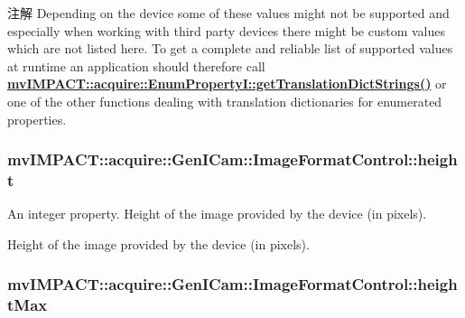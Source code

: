 \begin{DoxyNote}{注解}
Depending on the device some of these values might not be supported and especially when working with third party devices there might be custom values which are not listed here. To get a complete and reliable list of supported values at runtime an application should therefore call {\bfseries \hyperlink{classmv_i_m_p_a_c_t_1_1acquire_1_1_enum_property_i_a0ba6ccbf5ee69784d5d0b537924d26b6}{mv\+I\+M\+P\+A\+C\+T\+::acquire\+::\+Enum\+Property\+I\+::get\+Translation\+Dict\+Strings()}} or one of the other functions dealing with translation dictionaries for enumerated properties. 
\end{DoxyNote}
\hypertarget{classmv_i_m_p_a_c_t_1_1acquire_1_1_gen_i_cam_1_1_image_format_control_a5e3f3b5d6644aa765cce4f52b872a5c3}{
\subsubsection[{height}]{ mv\+I\+M\+P\+A\+C\+T\+::acquire\+::\+Gen\+I\+Cam\+::\+Image\+Format\+Control\+::height}}\label{classmv_i_m_p_a_c_t_1_1acquire_1_1_gen_i_cam_1_1_image_format_control_a5e3f3b5d6644aa765cce4f52b872a5c3}


An integer property. Height of the image provided by the device (in pixels). 

Height of the image provided by the device (in pixels). \hypertarget{classmv_i_m_p_a_c_t_1_1acquire_1_1_gen_i_cam_1_1_image_format_control_a8540e7cd78b644f597cd679a11558603}{
\subsubsection[{height\+Max}]{ mv\+I\+M\+P\+A\+C\+T\+::acquire\+::\+Gen\+I\+Cam\+::\+Image\+Format\+Control\+::height\+Max}}\label{classmv_i_m_p_a_c_t_1_1acquire_1_1_gen_i_cam_1_1_image_format_control_a8540e7cd78b644f597cd679a11558603}


